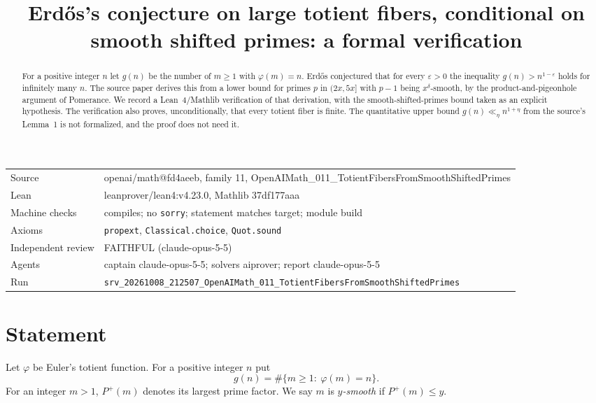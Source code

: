 \documentclass[11pt]{article}
\title{Erd\H{o}s's conjecture on large totient fibers, conditional on smooth shifted primes: a formal verification}
\date{}
\theoremstyle{definition}
\theoremstyle{remark}
\begin{document}
\maketitle
\begin{abstract}
For a positive integer $n$ let $g(n)$ be the number of $m\ge1$ with $\varphi(m)=n$. Erd\H{o}s conjectured that for every $\varepsilon>0$ the inequality $g(n)>n^{1-\varepsilon}$ holds for infinitely many $n$. The source paper derives this from a lower bound for primes $p$ in $(2x,5x]$ with $p-1$ being $x^\delta$-smooth, by the product-and-pigeonhole argument of Pomerance. We record a Lean~4/Mathlib verification of that derivation, with the smooth-shifted-primes bound taken as an explicit hypothesis. The verification also proves, unconditionally, that every totient fiber is finite. The quantitative upper bound $g(n)\ll_\eta n^{1+\eta}$ from the source's Lemma~1 is not formalized, and the proof does not need it.
\end{abstract}

\begin{center}\small
\begin{tabular}{@{}ll@{}}
\toprule
Source & openai/math@fd4aeeb, family 11, OpenAIMath\_011\_TotientFibersFromSmoothShiftedPrimes \\
Lean & leanprover/lean4:v4.23.0, Mathlib 37df177aaa \\
Machine checks & compiles; no \texttt{sorry}; statement matches target; module build \\
Axioms & \texttt{propext}, \texttt{Classical.choice}, \texttt{Quot.sound} \\
Independent review & FAITHFUL (claude-opus-5-5) \\
Agents & captain claude-opus-5-5; solvers aiprover; report claude-opus-5-5 \\
Run & \texttt{srv\_20261008\_212507\_OpenAIMath\_011\_TotientFibersFromSmoothShiftedPrimes} \\
\bottomrule
\end{tabular}
\end{center}

\tableofcontents

\section{Statement}

Let $\varphi$ be Euler's totient function. For a positive integer $n$ put
\[
 g(n)=\#\{m\ge1:\ \varphi(m)=n\}.
\]
For an integer $m>1$, $P^+(m)$ denotes its largest prime factor. We say $m$ is \emph{$y$-smooth} if $P^+(m)\le y$.
\end{document}
